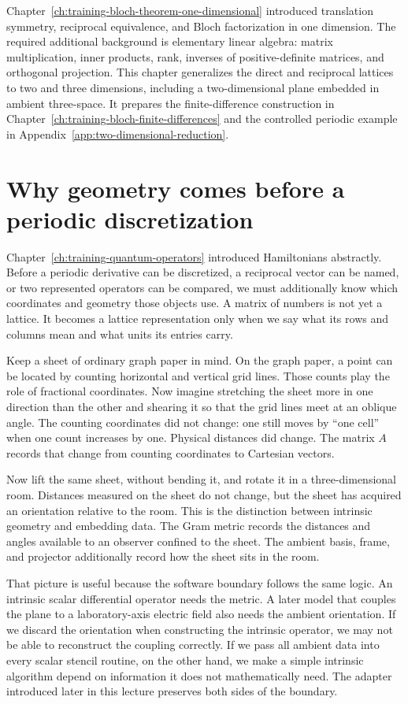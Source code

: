 Chapter~\ref{ch:training-bloch-theorem-one-dimensional} introduced translation
symmetry, reciprocal equivalence, and Bloch factorization in one dimension.
The required additional background is elementary linear algebra: matrix
multiplication, inner products, rank, inverses of positive-definite matrices,
and orthogonal projection. This chapter generalizes the direct and reciprocal
lattices to two and three dimensions, including a two-dimensional plane embedded
in ambient three-space. It prepares the finite-difference construction in
Chapter~\ref{ch:training-bloch-finite-differences} and the controlled periodic
example in Appendix~\ref{app:two-dimensional-reduction}.

\section{Why geometry comes before a periodic discretization}

Chapter~\ref{ch:training-quantum-operators} introduced Hamiltonians abstractly.
Before a periodic derivative can be discretized, a reciprocal vector can be
named, or two represented operators can be compared, we must additionally know
which coordinates and geometry those objects use. A matrix of numbers is not
yet a lattice. It becomes a lattice representation only when we say what its
rows and columns mean and what units its entries carry.

Keep a sheet of ordinary graph paper in mind. On the graph paper, a point can
be located by counting horizontal and vertical grid lines. Those counts play
the role of fractional coordinates. Now imagine stretching the sheet more in
one direction than the other and shearing it so that the grid lines meet at an
oblique angle. The counting coordinates did not change: one still moves by
``one cell'' when one count increases by one. Physical distances did change.
The matrix $A$ records that change from counting coordinates to Cartesian
vectors.

Now lift the same sheet, without bending it, and rotate it in a three-dimensional
room. Distances measured on the sheet do not change, but the sheet has acquired
an orientation relative to the room. This is the distinction between intrinsic
geometry and embedding data. The Gram metric records the distances and angles
available to an observer confined to the sheet. The ambient basis, frame, and
projector additionally record how the sheet sits in the room.

That picture is useful because the software boundary follows the same logic.
An intrinsic scalar differential operator needs the metric. A later model that
couples the plane to a laboratory-axis electric field also needs the ambient
orientation. If we discard the orientation when constructing the intrinsic
operator, we may not be able to reconstruct the coupling correctly. If we pass
all ambient data into every scalar stencil routine, on the other hand, we make
a simple intrinsic algorithm depend on information it does not mathematically
need. The adapter introduced later in this lecture preserves both sides of the
boundary.

